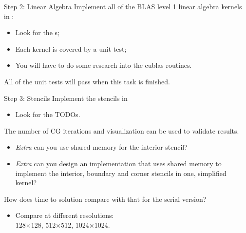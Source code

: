 \documentclass[aspectratio=43]{beamer}
\begin{document}
\begin{frame}[fragile]{Step 2: Linear Algebra}
    Implement all of the BLAS level 1 linear algebra kernels in :
    \begin{itemize}
        \item Look for the s;
        \item Each kernel is covered by a unit test;
        \item You will have to do some research into the cublas routines.
    \end{itemize}

    \begin{info}{}
        All of the unit tests will pass when this task is finished.
    \end{info}
\end{frame}

\begin{frame}[fragile]{Step 3: Stencils}
    Implement the stencils in 
    \begin{itemize}
        \item Look for the TODOs.
    \end{itemize}
    The number of CG iterations and visualization can be used to validate results.
    \begin{itemize}
        \item \emph{Extra} can you use shared memory for the interior stencil?
        \item \emph{Extra} can you design an implementation that uses shared memory to implement the interior, boundary and corner stencils in one, simplified kernel?
    \end{itemize}
    How does time to solution compare with that for the serial version?
    \begin{itemize}
        \item Compare at different resolutions:\\128$\times$128, 512$\times$512, 1024$\times$1024.
    \end{itemize}
\end{frame}

\end{document}
